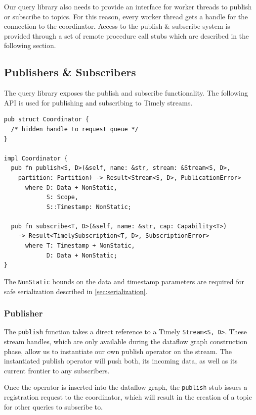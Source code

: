 Our query library also needs to provide an interface for worker threads to
publish or subscribe to topics. For this reason, every worker thread gets
a handle for the connection to the coordinator. Access to the
publish \& subscribe system is provided through a set of remote
procedure call stubs which are described in the following section.

\subsection{Publishers \& Subscribers}

The query library exposes the publish and subscribe functionality. The following
API is used for publishing and subscribing to Timely streams.

\begin{lstlisting}[caption={[Publish \& subscribe interface]
The interface for publishing and subscribing Timely streams.
}]
pub struct Coordinator {
  /* hidden handle to request queue */
}

impl Coordinator {
  pub fn publish<S, D>(&self, name: &str, stream: &Stream<S, D>,
    partition: Partition) -> Result<Stream<S, D>, PublicationError>
      where D: Data + NonStatic, 
            S: Scope,
            S::Timestamp: NonStatic;

  pub fn subscribe<T, D>(&self, name: &str, cap: Capability<T>) 
    -> Result<TimelySubscription<T, D>, SubscriptionError>
      where T: Timestamp + NonStatic, 
            D: Data + NonStatic;
}
\end{lstlisting}

The \lstinline{NonStatic} bounds on the data and timestamp
parameters are required for safe serialization described in \ref{sec:serialization}.

\subsubsection{Publisher}

The \lstinline{publish} function takes a direct reference to a Timely
\lstinline{Stream<S, D>}. These stream handles, which are only available during
the dataflow graph construction phase, allow us to instantiate our own publish
operator on the stream.  The instantiated publish operator will push both, its
incoming data, as well as its current frontier to any subscribers. 

Once the operator is inserted into the dataflow graph, the \lstinline{publish}
stub issues a registration request to the coordinator, which will result in the
creation of a topic for other queries to subscribe to.

